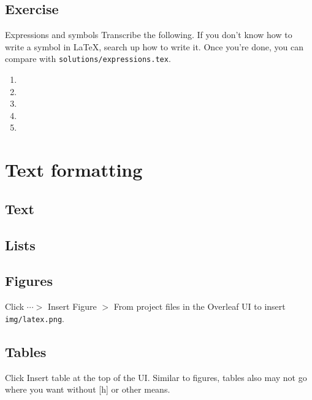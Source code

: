 \documentclass{article}
\begin{document}
\subsection{Exercise}

\begin{exercise}{Expressions and symbols}{}
    Transcribe the following. If you don't know how to write a symbol in \LaTeX, search up how to write it. Once you're done, you can compare with \texttt{solutions/expressions.tex}.

    
\end{exercise}

\begin{solution}{}{}
    \begin{enumerate}
        \item 
        \item 
        \item 
        \item 
        \item 
    \end{enumerate}
\end{solution}

\section{Text formatting}

\subsection{Text}

\subsection{Lists}

\subsection{Figures}

Click $\cdots >$ Insert Figure $>$ From project files in the Overleaf UI to insert \texttt{img/latex.png}.

\subsection{Tables}

Click Insert table at the top of the UI. Similar to figures, tables also may not go where you want without [h] or other means.
\end{document}
